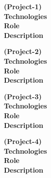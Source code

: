 \documentclass[a4paper,11pt]{memoir} %
\begin{document}
\Sep
\begin{minipage}[t]{0.20\columnwidth}
\textbf{(Project-1)}\\
\textbf{Technologies}\\
\textbf{Role}\\
\textbf{Description}

\vspace{19.3mm}

\textbf{(Project-2)}\\
\textbf{Technologies}\\
\textbf{Role}\\
\textbf{Description}

\vspace{9.5 mm}

\textbf{(Project-3)}\\
\textbf{Technologies}\\
\textbf{Role}\\
\textbf{Description}\\

\vspace{10.5 mm}

\textbf{(Project-4)}\\
\textbf{Technologies}\\
\textbf{Role}\\
\textbf{Description}\\

\end{minipage}
\hfill
\end{document}
